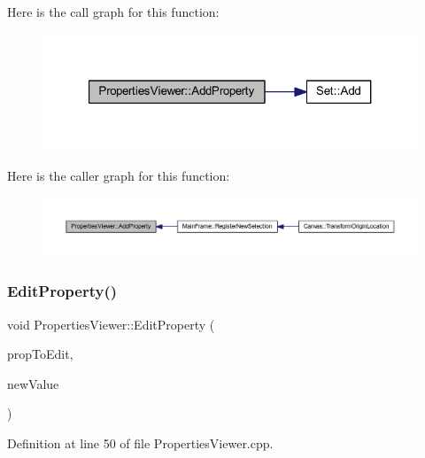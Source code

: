 Here is the call graph for this function\+:
\nopagebreak
\begin{figure}[H]
\begin{center}
\leavevmode
\includegraphics[width=321pt]{class_properties_viewer_ae8fe6d69893153aa755656e9db880bfd_cgraph}
\end{center}
\end{figure}
Here is the caller graph for this function\+:
\nopagebreak
\begin{figure}[H]
\begin{center}
\leavevmode
\includegraphics[width=350pt]{class_properties_viewer_ae8fe6d69893153aa755656e9db880bfd_icgraph}
\end{center}
\end{figure}
\mbox{\label{class_properties_viewer_ac726c244cf706ab9de1b2c3c6e55af2d}} 
\subsubsection{\texorpdfstring{Edit\+Property()}{EditProperty()}}
{\footnotesize\ttfamily void Properties\+Viewer\+::\+Edit\+Property (\begin{DoxyParamCaption}\item[{wx\+P\+G\+Property $\ast$}]{prop\+To\+Edit,  }\item[{wx\+Variant $\ast$}]{new\+Value }\end{DoxyParamCaption})}



Definition at line 50 of file Properties\+Viewer.\+cpp.

